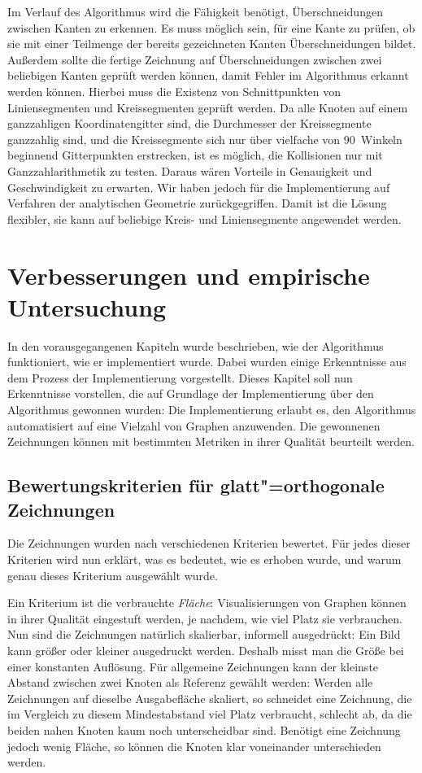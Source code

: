 \documentclass[a4paper]{scrreprt}
\theoremstyle{definition}
\begin{document}
Im Verlauf des Algorithmus wird die Fähigkeit benötigt, Überschneidungen zwischen Kanten zu erkennen. Es muss möglich sein, für eine Kante zu prüfen, ob sie mit einer Teilmenge der bereits gezeichneten Kanten Überschneidungen bildet. Außerdem sollte die fertige Zeichnung auf Überschneidungen zwischen zwei beliebigen Kanten geprüft werden können, damit Fehler im Algorithmus erkannt werden können. Hierbei muss die Existenz von Schnittpunkten von Liniensegmenten und Kreissegmenten geprüft werden. Da alle Knoten auf einem ganzzahligen Koordinatengitter sind, die Durchmesser der Kreissegmente ganzzahlig sind, und die Kreissegmente sich nur über vielfache von 90\textdegree~Winkeln beginnend Gitterpunkten erstrecken, ist es möglich, die Kollisionen nur mit Ganzzahlarithmetik zu testen. Daraus wären Vorteile in Genauigkeit und Geschwindigkeit zu erwarten. Wir haben jedoch für die Implementierung auf Verfahren der analytischen Geometrie zurückgegriffen. Damit ist die Lösung flexibler, sie kann auf beliebige Kreis- und Liniensegmente angewendet werden.


\chapter{Verbesserungen und empirische Untersuchung}
\label{chap:results}

In den vorausgegangenen Kapiteln wurde beschrieben, wie der Algorithmus funktioniert, wie er implementiert wurde. Dabei wurden einige Erkenntnisse aus dem Prozess der Implementierung vorgestellt. Dieses Kapitel soll nun Erkenntnisse vorstellen, die auf Grundlage der Implementierung über den Algorithmus gewonnen wurden: Die Implementierung erlaubt es, den Algorithmus automatisiert auf eine Vielzahl von Graphen anzuwenden. Die gewonnenen Zeichnungen können mit bestimmten Metriken in ihrer Qualität beurteilt werden.

\section{Bewertungskriterien für glatt"=orthogonale Zeichnungen}

Die Zeichnungen wurden nach verschiedenen Kriterien bewertet. Für jedes dieser Kriterien wird nun erklärt, was es bedeutet, wie es erhoben wurde, und warum genau dieses Kriterium ausgewählt wurde.

Ein Kriterium ist die verbrauchte \emph{Fläche}: Visualisierungen von Graphen können in ihrer Qualität eingestuft werden, je nachdem, wie viel Platz sie verbrauchen. Nun sind die Zeichnungen natürlich skalierbar, informell ausgedrückt: Ein Bild kann größer oder kleiner ausgedruckt werden. Deshalb misst man die Größe bei einer konstanten Auflösung. Für allgemeine Zeichnungen kann der kleinste Abstand zwischen zwei Knoten als Referenz gewählt werden: Werden alle Zeichnungen auf dieselbe Ausgabefläche skaliert, so schneidet eine Zeichnung, die im Vergleich zu diesem Mindestabstand viel Platz verbraucht, schlecht ab, da die beiden nahen Knoten kaum noch unterscheidbar sind. Benötigt eine Zeichnung jedoch wenig Fläche, so können die Knoten klar voneinander unterschieden werden.
\end{document}
